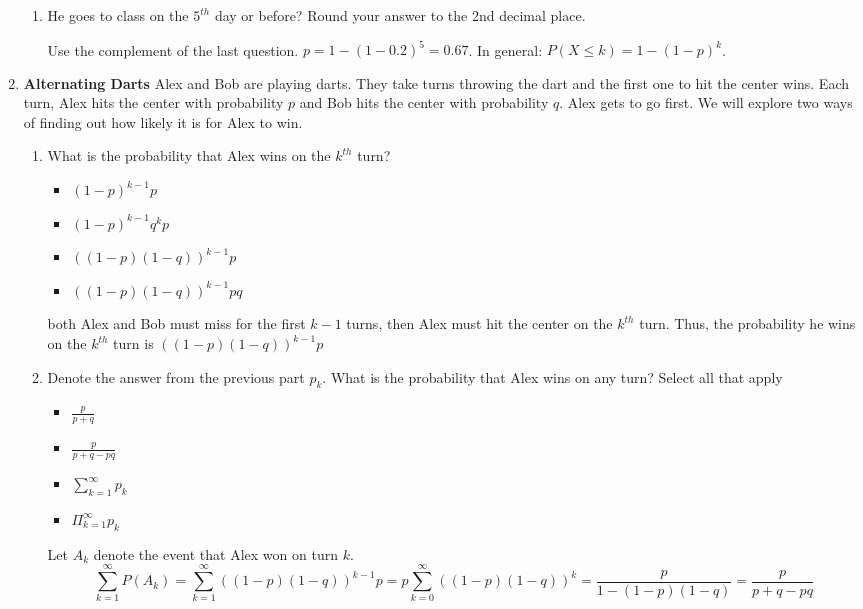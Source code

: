 \documentclass[11pt, preview]{standalone} %
\begin{document}
\begin{enumerate}
\begin{enumerate}
    \item He goes to class on the $5^{th}$ day or before? Round your answer to the 2nd decimal place.
    \begin{Freeform}{0.67}

    \Solution Use the complement of the last question. $p = 1-(1-0.2)^5 = 0.67$. In general: $P(X\leq k) = 1-(1-p)^k$.  
    \end{Freeform}

\end{enumerate}

\item {\bf Alternating Darts} Alex and Bob are playing darts. They take turns throwing the dart and the first one to hit the center wins. Each turn, Alex hits the center with probability $p$ and Bob hits the center with probability $q$. Alex gets to go first. We will explore two ways of finding out how likely it is for Alex to win.

\begin{enumerate}
    \item What is the probability that Alex wins on the $k^{th}$ turn? 
    \begin{Choices}
    \begin{itemize}
    	\FalseChoice\item $(1-p)^{k-1}p$
    	\FalseChoice\item $(1-p)^{k-1}q^kp$
    	\TrueChoice\item $((1-p)(1-q))^{k-1}p$
    	\FalseChoice\item $((1-p)(1-q))^{k-1}pq$
    \end{itemize}
    \Solution both Alex and Bob must miss for the first $k-1$ turns, then Alex must hit the center on the $k^{th}$ turn. Thus, the probability he wins on the $k^{th}$ turn is $((1-p)(1-q))^{k-1}p$
    \end{Choices}


    \item Denote the answer from the previous part $p_k$. What is the probability that Alex wins on any turn? Select all that apply
    \begin{Multi}
    \begin{itemize}
    	\FalseChoice\item $\frac{p}{p+q}$
    	\TrueChoice\item $\frac{p}{p+q-pq}$
    	\TrueChoice\item $\sum_{k=1}^{\infty} p_k$
    	\FalseChoice\item $\Pi_{k=1}^{\infty} p_k$
    \end{itemize}
    \Solution Let $A_k$ denote the event that Alex won on turn $k$.
    $$\sum_{k=1}^{\infty} P(A_k) = \sum_{k=1}^{\infty}((1-p)(1-q))^{k-1}p = p\sum_{k=0}^\infty((1-p)(1-q))^{k} = \frac{p}{1-(1-p)(1-q)} = \frac{p}{p+q-pq} $$
    \end{Multi}
    


\end{enumerate}
\end{enumerate}
\end{document}
